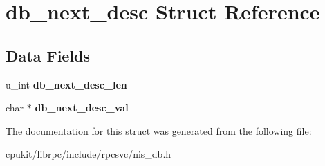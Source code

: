 \hypertarget{structdb__next__desc}{}\section{db\+\_\+next\+\_\+desc Struct Reference}
\label{structdb__next__desc}
\subsection*{Data Fields}
\begin{DoxyCompactItemize}
\item 
\mbox{\label{structdb__next__desc_af3025a7f8945711ddf27c5d0558ce48b}} 
u\+\_\+int {\bfseries db\+\_\+next\+\_\+desc\+\_\+len}
\item 
\mbox{\label{structdb__next__desc_a00a7b0a623e66be6a97ab17cf13094d4}} 
char $\ast$ {\bfseries db\+\_\+next\+\_\+desc\+\_\+val}
\end{DoxyCompactItemize}


The documentation for this struct was generated from the following file\+:\begin{DoxyCompactItemize}
\item 
cpukit/librpc/include/rpcsvc/nis\+\_\+db.\+h\end{DoxyCompactItemize}
